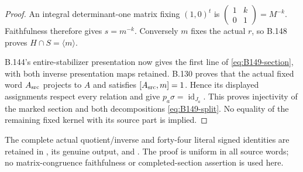 \begin{proof}
An integral determinant-one matrix fixing $(1,0)^t$ is
$\left(\begin{smallmatrix}1&k\\0&1\end{smallmatrix}\right)=M^{-k}$.
Faithfulness therefore gives $s=m^{-k}$. Conversely $m$ fixes the
actual $r$, so B.148 proves $H\cap S=\langle m\rangle$.

B.144's entire-stabilizer presentation now gives the first line of
\eqref{eq:B149-section}, with both inverse presentation maps retained.
B.130 proves that the actual fixed word $A_{\rm src}$ projects to $A$
and satisfies $[A_{\rm src},m]=1$. Hence its displayed assignments
respect every relation and give $p_a\sigma=\operatorname{id}_{J_a}$. This proves injectivity
of the marked section and both decompositions \eqref{eq:B149-split}.
No equality of the remaining fixed kernel with its source part is
implied.
\end{proof}
The complete actual quotient/inverse and forty-four literal signed
identities are retained in
,
its genuine output, and
.
The proof is uniform in all source words; no matrix-congruence
faithfulness or completed-section assertion is used here.
